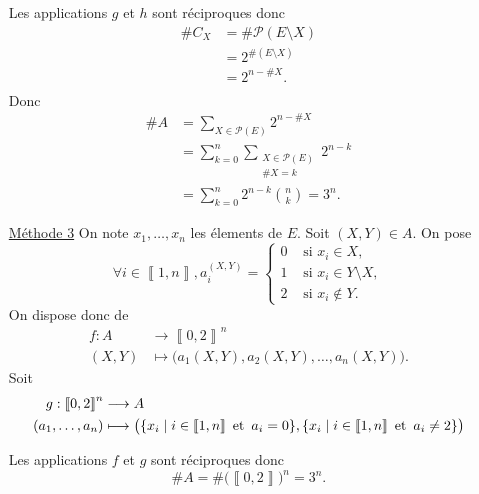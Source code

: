 \begin{itemize}
		Les applications $g$ et $h$ sont réciproques donc 
		\begin{align*}
			\#C_X &= \#\mathcal{P}(E\setminus X) \\
			&= 2^{\#(E\setminus X)} \\
			&= 2^{n - \#X}. \\
		\end{align*}
		Donc
		\begin{align*}
			\#A &= \sum_{X \in \mathcal{P}(E)}2^{n - \#X}\\
			&= \sum_{k=0}^n \sum_{\substack{X \in \mathcal{P}(E)\\ \#X = k}} 2^{n-k} \\
			&= \sum_{k=0}^n 2^{n-k} {n \choose k} = 3^n.
		\end{align*}
	\item[\underline{\sc Méthode 3}] %
		On note $x_1, \ldots, x_n$ les élements de $E$. Soit $(X,Y) \in A$. On pose \[
			\forall i \in \left\llbracket 1,n \right\rrbracket, a_i^{(X,Y)} = \begin{cases}
				0 &\text{ si } x_i \in X,\\
				1 &\text{ si } x_i \in Y \setminus X,\\
				2 &\text{ si } x_i \not\in Y.
			\end{cases}
		\] On dispose donc de \begin{align*}
			f: A &\longrightarrow \left\llbracket 0,2 \right\rrbracket^n \\
			(X,Y) &\longmapsto \big(a_1(X,Y), a_2(X,Y), \ldots, a_n(X,Y)\big).
		\end{align*}
		Soit  \begin{align*}
			g: \left\llbracket 0,2 \right\rrbracket^n &\longrightarrow A  \\
			(a_1, \ldots, a_n) &\longmapsto \big(\{x_i  \mid i \in \left\llbracket 1,n \right\rrbracket \operatorname{\text{ et }} a_i = 0\}, \{x_i  \mid i \in \left\llbracket 1,n \right\rrbracket \operatorname{\text{ et }} a_i \neq 2\}  \big) 
		\end{align*}

		Les applications $f$ et $g$ sont réciproques donc \[
			\#A = \#\big(\left\llbracket 0,2 \right\rrbracket\big)^n = 3^n. 
		\]
\end{itemize}
